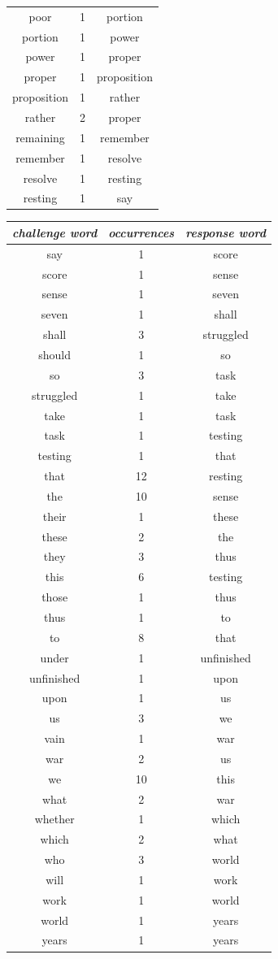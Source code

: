 \begin{multicols}{2}
\begin{tabular}{ccc}
poor & 1 & portion \\
portion & 1 & power \\
power & 1 & proper \\
proper & 1 & proposition \\
proposition & 1 & rather \\
rather & 2 & proper \\
remaining & 1 & remember \\
remember & 1 & resolve \\
resolve & 1 & resting \\
resting & 1 & say \\
\end{tabular}

\columnbreak

\begin{tabular}{ccc}
\textit{challenge word} & \textit{occurrences} & \textit{response word} \\ \hline
say & 1 & score \\
score & 1 & sense \\
sense & 1 & seven \\
seven & 1 & shall \\
shall & 3 & struggled \\
should & 1 & so \\
so & 3 & task \\
struggled & 1 & take \\
take & 1 & task \\
task & 1 & testing \\
testing & 1 & that \\
that & 12 & resting \\
the & 10 & sense \\
their & 1 & these \\
these & 2 & the \\
they & 3 & thus \\
this & 6 & testing \\
those & 1 & thus \\
thus & 1 & to \\
to & 8 & that \\
under & 1 & unfinished \\
unfinished & 1 & upon \\
upon & 1 & us \\
us & 3 & we \\
vain & 1 & war \\
war & 2 & us \\
we & 10 & this \\
what & 2 & war \\
whether & 1 & which \\
which & 2 & what \\
who & 3 & world \\
will & 1 & work \\
work & 1 & world \\
world & 1 & years \\
years & 1 & years \\
\end{tabular}
\end{multicols}


